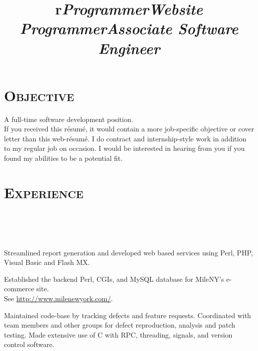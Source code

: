 \begin{resume}

\section{\textsc{Objective}}
A full-time software development position.\\If you received this r\'esum\'e, it would contain a more job-specific objective or cover letter than this web-r\'esum\'e.  I do contract and internship-style work in addition to my regular job on occasion.  I would be interested in hearing from you if you found my abilities to be a potential fit.

\section{\textsc{Experience}}
\begin{format}
  \title{r}\\
  \\
  \body\\
\end{format}

\title{\emph{Programmer}}
\begin{position}
Streamlined report generation and developed web based services
using Perl, PHP, Visual Basic and Flash MX.
\end{position}

\title{\emph{Website Programmer}}
\begin{position}
Established the backend Perl, CGIs, and MySQL database for MileNY's e-commerce site.
\\
{\small{See \href{http://www.milenewyork.com/}{http://www.milenewyork.com/}.}}
\end{position}

\title{\emph{Associate Software Engineer}}
\begin{position}
Maintained code-base by tracking defects and feature requests.
Coordinated with team members and other groups for defect reproduction, analysis and patch testing.
Made extensive use of C with RPC, threading, signals, and version control software.
\end{position}


\end{resume}
